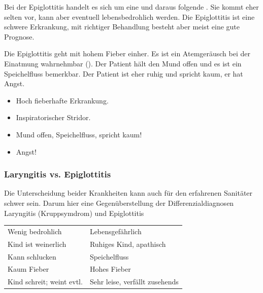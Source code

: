 {
Bei der Epiglottitis handelt es sich um eine  und
daraus folgende . Sie kommt eher selten vor, kann aber
eventuell lebensbedrohlich werden. Die Epiglottitis ist eine schwere Erkrankung, mit
richtiger  Behandlung besteht aber meist eine gute Prognose.
}{
}{}{}{}



{
Die Epiglottitis geht mit hohem Fieber einher. Es ist ein Atemgeräusch bei der
Einatmung wahrnehmbar (). Der Patient hält den
Mund offen und es ist ein Speichelfluss bemerkbar. Der
Patient ist eher ruhig und spricht kaum, er hat Angst. 
}{
\begin{itemize}
    \item Hoch fieberhafte Erkrankung.
    \item Inspiratorischer Stridor.
    \item Mund offen, Speichelfluss, spricht kaum!
    \item Angst!
\end{itemize}
}{}{}{}


 \subsubsection{Laryngitis vs. Epiglottitis}
 
Die Unterscheidung beider Krankheiten kann auch für den erfahrenen Sanitäter schwer sein. Darum hier eine Gegenüberstellung der Differenzialdiagnosen Laryngitis (Kruppsymdrom) und Epiglottitis

\begin{table}[H]

\begin{tabulary}{12cm}{LL}\addlinespace
{}
&
\\\midrule
Wenig bedrohlich
&
Lebensgefährlich
\\\addlinespace
Kind ist weinerlich
&
Ruhiges Kind, apathisch
\\\addlinespace
Kann schlucken
&
Speichelfluss
\\\addlinespace
Kaum Fieber
&
Hohes Fieber
\\\addlinespace
Kind schreit; weint evtl.
&
Sehr leise, verfällt zusehends
\\\bottomrule
\end{tabulary}
\end{table}
 
